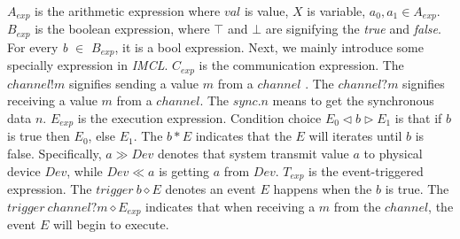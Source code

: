 $A_{exp}$ is the arithmetic expression where $val$ is value, $X$ is variable, $a_{0}, a_{1} \in A_{exp}$.
$B_{exp}$ is the boolean expression, where $\top$ and $\bot$ are signifying the \emph{true} and \emph{false}. For every \emph{b} $\in$ $B_{exp}$, it is a bool expression. Next, we mainly introduce some specially expression in \emph{IMCL}. $C_{exp}$ is the communication expression. The $channel!m$ signifies sending a value $m$ from a $channel$ . The $channel?m$ signifies receiving a value $m$ from a $channel$. The $sync.n$ means to get the synchronous data $n$.
$E_{exp}$ is the execution expression. Condition choice $E_{0} \triangleleft b \triangleright E_{1}$ is that if $b$ is true then $E_{0}$, else $E_{1}$. The $b * E$ indicates that the $E$ will iterates until $b$ is false. Specifically, $a \gg Dev$ denotes that system transmit value $a$ to physical device $Dev$, while $Dev \ll a$ is getting $a$ from $Dev$. $T_{exp}$ is the event-triggered expression. The $trigger \ b \diamond E$ denotes an event $E$ happens when the $b$ is true. The $ trigger \ channel?m \diamond E_{exp}$ indicates that when receiving a $m$ from the $channel$, the event $E$ will begin to execute.

